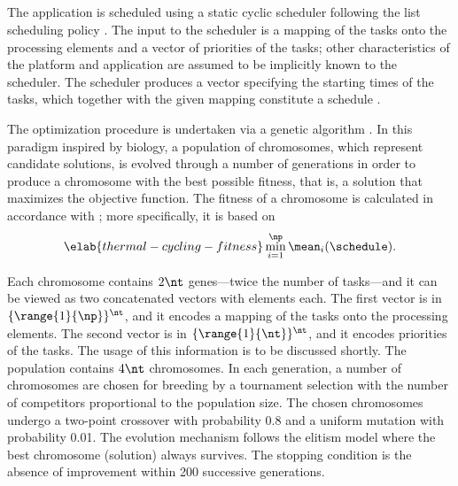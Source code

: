 \subsection{\solutiontitle}

The application is scheduled using a static cyclic scheduler following the list
scheduling policy \cite{adam1974}. The input to the scheduler is a mapping of
the tasks onto the processing elements and a vector of priorities of the tasks;
other characteristics of the platform and application are assumed to be
implicitly known to the scheduler. The scheduler produces a vector specifying
the starting times of the tasks, which together with the given mapping
constitute a schedule \schedule.

The optimization procedure is undertaken via a genetic algorithm
\cite{schmitz2004}. In this paradigm inspired by biology, a population of
chromosomes, which represent candidate solutions, is evolved through a number of
generations in order to produce a chromosome with the best possible fitness,
that is, a solution that maximizes the objective function. The fitness of a
chromosome is calculated in accordance with ;
more specifically, it is based on
\begin{equation} \elab{thermal-cycling-fitness}
  \min_{i = 1}^\np \mean_i(\schedule).
\end{equation}

Each chromosome contains $2 \nt$ genes---twice the number of tasks---and it can
be viewed as two concatenated vectors with \nt elements each. The first vector
is in $\{ \range{1}{\np} \}^\nt$, and it encodes a mapping of the tasks onto the
processing elements. The second vector is in $\{ \range{1}{\nt} \}^\nt$, and it
encodes priorities of the tasks. The usage of this information is to be
discussed shortly. The population contains $4 \nt$ chromosomes. In each
generation, a number of chromosomes are chosen for breeding by a tournament
selection with the number of competitors proportional to the population size.
The chosen chromosomes undergo a two-point crossover with probability 0.8 and a
uniform mutation with probability 0.01. The evolution mechanism follows the
elitism model where the best chromosome (solution) always survives. The stopping
condition is the absence of improvement within 200 successive generations.

